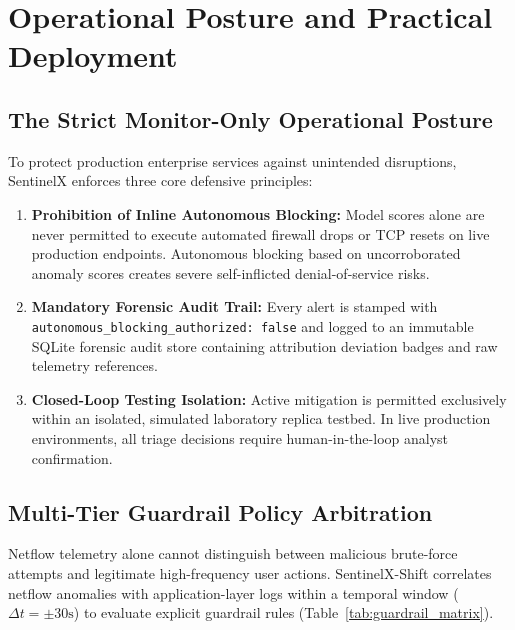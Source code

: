 \documentclass[conference,10pt,twocolumn]{IEEEtran}
\begin{document}
\section{Operational Posture and Practical Deployment}

\subsection{The Strict Monitor-Only Operational Posture}
To protect production enterprise services against unintended disruptions, SentinelX enforces three core defensive principles:
\begin{enumerate}
    \item \textbf{Prohibition of Inline Autonomous Blocking:} Model scores alone are never permitted to execute automated firewall drops or TCP resets on live production endpoints. Autonomous blocking based on uncorroborated anomaly scores creates severe self-inflicted denial-of-service risks.
    \item \textbf{Mandatory Forensic Audit Trail:} Every alert is stamped with \texttt{autonomous\_blocking\_authorized: false} and logged to an immutable SQLite forensic audit store containing attribution deviation badges and raw telemetry references.
    \item \textbf{Closed-Loop Testing Isolation:} Active mitigation is permitted exclusively within an isolated, simulated laboratory replica testbed. In live production environments, all triage decisions require human-in-the-loop analyst confirmation.
\end{enumerate}

\subsection{Multi-Tier Guardrail Policy Arbitration}
Netflow telemetry alone cannot distinguish between malicious brute-force attempts and legitimate high-frequency user actions. SentinelX-Shift correlates netflow anomalies with application-layer logs within a temporal window ($\Delta t = \pm 30\text{s}$) to evaluate explicit guardrail rules (Table~\ref{tab:guardrail_matrix}).
\end{document}
